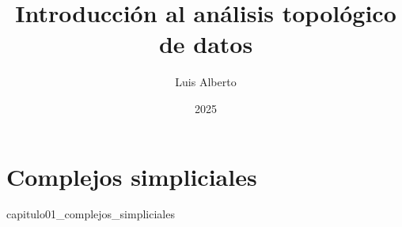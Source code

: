\documentclass[12pt,oneside]{book}
\theoremstyle{definition}
\begin{document}
\author{Luis Alberto}
\title{Introducción al análisis topológico de datos}
\date{2025}

\frontmatter
\maketitle
\tableofcontents

\mainmatter
\chapter{Complejos simpliciales}
\label{ch:simplicial_complexes}
{capitulo01_complejos_simpliciales}

\backmatter


\end{document}
